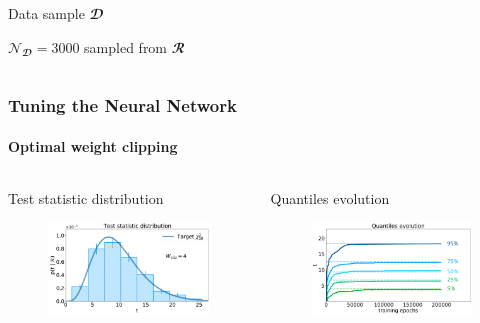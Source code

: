 \documentclass{beamer}
\begin{document}
\begin{frame}
\begin{columns}
\begin{column}{0.5\textwidth}
\begin{alertblock}{Data sample $\mathbfcal{D}$}
\begin{figure}
					\end{figure}
					$\mathcal{N}_{\mathbfcal{D}}=3000$ sampled from $\mathbfcal{R}$
				\end{alertblock}
			\end{column}
		\end{columns}
	\end{frame}	

	

	\begin{frame}
		\frametitle{Tuning the Neural Network}
		\framesubtitle{Optimal weight clipping}

		\begin{columns}
			\begin{column}{0.5\textwidth}
				\begin{alertblock}{Test statistic distribution}
					\begin{figure}
						\centering 
						\includegraphics[width=1.0\textwidth]{../PLOTS/DRIFT_TIME/thesis/t_reference.pdf}
					\end{figure}
				\end{alertblock}	
			\end{column}
			\begin{column}{0.5\textwidth}
				\begin{alertblock}{Quantiles evolution}
					\begin{figure}
						\centering 
						\includegraphics[width=1.0\textwidth]{../PLOTS/DRIFT_TIME/thesis/a_reference_quantiles.pdf}

\end{figure}
\end{alertblock}
\end{column}
\end{columns}
\end{frame}
\end{document}
